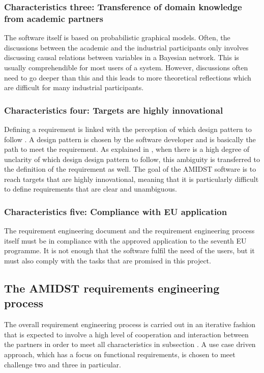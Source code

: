 \documentclass[11pt, oneside]{article}   	%
\begin{document}
\subsubsection{Characteristics three: Transference of domain knowledge from academic partners}
\label{sec:characteristic3}
The software itself is based on probabilistic graphical models.  Often, the discussions between the academic and the industrial participants only involves discussing causal relations between variables in a Bayesian network.  This is usually comprehendible for most users of a system.  However, discussions often need to go deeper than this and this leads to more theoretical reflections which are difficult for many industrial participants. 

\subsubsection{Characteristics four: Targets are highly innovational}
\label{sec:characteristic4}
Defining a requirement is linked with the perception of which design pattern to follow \cite{Ral13}.  A design pattern is chosen by the software developer and is basically the path to meet the requirement.  As explained in \cite{Ral13}, when there is a high degree of unclarity of which design design pattern to follow, this ambiguity is transferred to the definition of the requirement as well.  The goal of the AMIDST software is to reach targets that are highly innovational, meaning that it is particularly difficult to define requirements that are clear and unambiguous.

\subsubsection{Characteristics five: Compliance with EU application}
\label{sec:characteristic5}
The requirement engineering document and the requirement engineering process itself must be in compliance
with the approved application to the seventh EU programme. It is not enough that the software fulfil the need of the users, but it must also comply with the tasks that are promised in this project. 

\subsection{The AMIDST requirements engineering process}
\label{sec:reprocess}

The overall requirement engineering process is carried out in an iterative fashion that is expected to involve a high level of cooperation and interaction between the partners in order to meet all characteristics in subsection \label{sec:characteristics}.  A use case driven approach, which has a focus on functional requirements, is chosen to meet challenge two and three in particular.  
\end{document}

